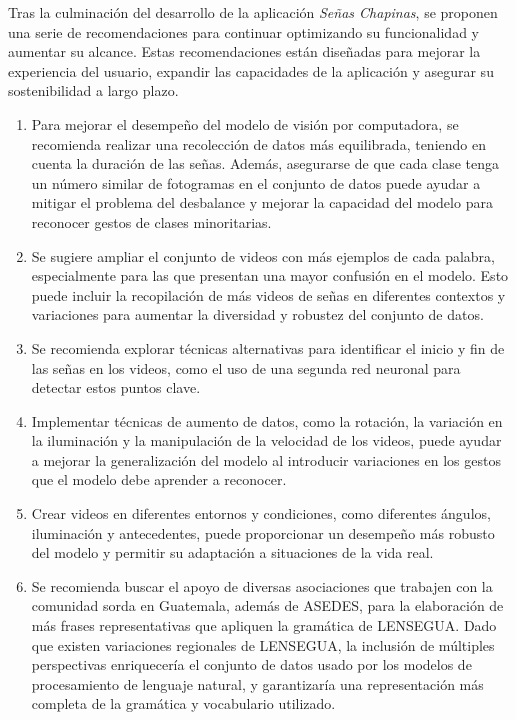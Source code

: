 
Tras la culminación del desarrollo de la aplicación \textit{Señas Chapinas}, se proponen una serie de recomendaciones para continuar optimizando su funcionalidad y aumentar su alcance. Estas recomendaciones están diseñadas para mejorar la experiencia del usuario, expandir las capacidades de la aplicación y asegurar su sostenibilidad a largo plazo.

\begin{enumerate}

    
\item Para mejorar el desempeño del modelo de visión por computadora, se recomienda realizar una recolección de datos más equilibrada, teniendo en cuenta la duración de las señas. Además, asegurarse de que cada clase tenga un número similar de fotogramas en el conjunto de datos puede ayudar a mitigar el problema del desbalance y mejorar la capacidad del modelo para reconocer gestos de clases minoritarias.

\item Se sugiere ampliar el conjunto de videos con más ejemplos de cada palabra, especialmente para las que presentan una mayor confusión en el modelo. Esto puede incluir la recopilación de más videos de señas en diferentes contextos y variaciones para aumentar la diversidad y robustez del conjunto de datos.

\item Se recomienda explorar técnicas alternativas para identificar el inicio y fin de las señas en los videos, como el uso de una segunda red neuronal para detectar estos puntos clave.

\item Implementar técnicas de aumento de datos, como la rotación, la variación en la iluminación y la manipulación de la velocidad de los videos, puede ayudar a mejorar la generalización del modelo al introducir variaciones en los gestos que el modelo debe aprender a reconocer.

\item Crear videos en diferentes entornos y condiciones, como diferentes ángulos, iluminación y antecedentes, puede proporcionar un desempeño más robusto del modelo y permitir su adaptación a situaciones de la vida real.

    
\item Se recomienda buscar el apoyo de diversas asociaciones que trabajen con la comunidad sorda en Guatemala, además de ASEDES, para la elaboración de más frases representativas que apliquen la gramática de LENSEGUA. Dado que existen variaciones regionales de LENSEGUA, la inclusión de múltiples perspectivas enriquecería el conjunto de datos usado por los modelos de procesamiento de lenguaje natural, y garantizaría una representación más completa de la gramática y vocabulario utilizado.


\end{enumerate}
